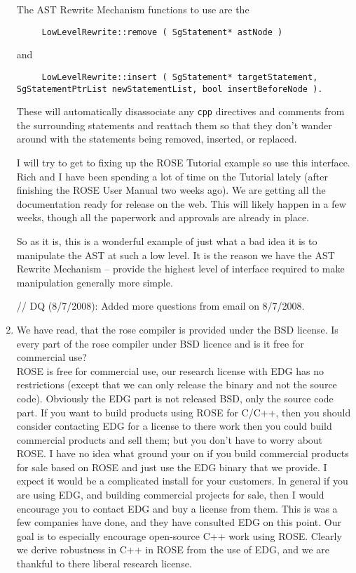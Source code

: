 \begin{enumerate}
The AST Rewrite Mechanism functions to use are the 
{\indent
{\mySmallFontSize
\begin{verbatim}
     LowLevelRewrite::remove ( SgStatement* astNode )
\end{verbatim}
}}
and 
{\indent
{\mySmallFontSize
\begin{verbatim}
     LowLevelRewrite::insert ( SgStatement* targetStatement, SgStatementPtrList newStatementList, bool insertBeforeNode ).
\end{verbatim}
}}

These will automatically disassociate any {\tt cpp} directives and comments
from the surrounding statements and reattach them so that they don't
wander around with the statements being removed, inserted, or replaced.

I will try to get to fixing up the ROSE Tutorial example so use this
interface.  Rich and I have been spending a lot of time on the Tutorial 
lately (after finishing the ROSE User Manual two weeks ago).  We are getting
all the documentation ready for release on the web.  This will likely 
happen in a few weeks, though all the paperwork and approvals are already
in place.

So as it is, this is a wonderful example of just what a bad idea it is
to manipulate the AST at such a low level.
It is the reason we have the AST Rewrite Mechanism -- provide the highest level
of interface required to make manipulation generally more simple.



// DQ (8/7/2008): Added more questions from email on 8/7/2008.
\item  We have read, that the rose compiler is provided under the BSD license. Is every
    part of the rose compiler under BSD licence and is it free for commercial use? \\
   ROSE is free for commercial use, our research license with EDG has no
restrictions (except that we can only release the binary and not the source code).
Obviously the EDG part is not released BSD, only the source code part.
If you want to build products using ROSE for C/C++, then you should
consider contacting EDG for a license to there work then you could
build commercial products and sell them; but you don't have to worry
about ROSE.  I have no idea what ground your on if you build commercial
products for sale based on ROSE and just use the EDG binary
that we provide.  I expect it would be a complicated install for your customers. 
In general if you are using EDG, and building commercial projects for sale,
then I would encourage you to contact EDG and buy a license from them.
This is was a few companies have done, and they have consulted EDG on this
point.  Our goal is to especially encourage open-source C++ work using ROSE.
Clearly we derive robustness in C++ in ROSE from the use of EDG, and we
are thankful to there liberal research license.


\end{enumerate}
